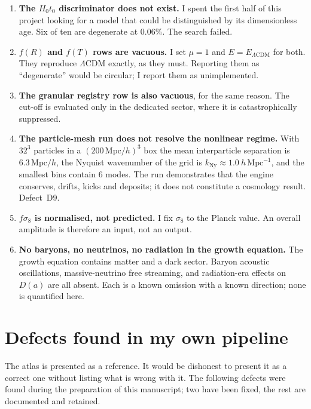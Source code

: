 \documentclass[11pt,a4paper]{article}
\theoremstyle{definition}
\newcommand{\Hzt}{H_0 t_0}
\newcommand{\Mpc}{\,\mathrm{Mpc}}
\begin{document}
\begin{enumerate}[label=\textbf{N\arabic*.}]
\item \textbf{The $\Hzt$ discriminator does not exist.} I spent the first
half of this project looking for a model that could be distinguished by its
dimensionless age. Six of ten are degenerate at $0.06\%$. The search failed.

\item \textbf{$f(R)$ and $f(T)$ rows are vacuous.} I set $\mu = 1$ and
$E = E_{\Lambda\mathrm{CDM}}$ for both. They reproduce $\Lambda$CDM exactly,
as they must. Reporting them as ``degenerate'' would be circular; I report
them as unimplemented.

\item \textbf{The granular registry row is also vacuous}, for the same reason.
The cut-off is evaluated only in the dedicated sector, where it is
catastrophically suppressed.

\item \textbf{The particle-mesh run does not resolve the nonlinear regime.}
With $32^3$ particles in a $(200\Mpc/h)^3$ box the mean interparticle
separation is $6.3\Mpc/h$, the Nyquist wavenumber of the grid is
$k_{\mathrm{Ny}} \approx 1.0\ h\,\mathrm{Mpc^{-1}}$, and the smallest bins
contain 6 modes. The run demonstrates that the engine conserves, drifts,
kicks and deposits; it does not constitute a cosmology result. Defect~D9.

\item \textbf{$f\sigma_8$ is normalised, not predicted.} I fix $\sigma_8$ to
the Planck value. An overall amplitude is therefore an input, not an output.

\item \textbf{No baryons, no neutrinos, no radiation in the growth equation.}
The growth equation contains matter and a dark sector. Baryon acoustic
oscillations, massive-neutrino free streaming, and radiation-era effects on
$D(a)$ are all absent. Each is a known omission with a known direction; none
is quantified here.
\end{enumerate}

\section{Defects found in my own pipeline}
\label{sec:defects}

The atlas is presented as a reference. It would be dishonest to present it as
a correct one without listing what is wrong with it. The following defects
were found during the preparation of this manuscript; two have been fixed,
the rest are documented and retained.
\end{document}
